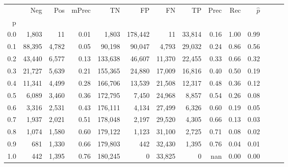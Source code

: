 \begin{tabular}{rrrrrrrrrrrrrr}
\toprule
{} &     Neg &    Pos & mPrec &       TN &       FP &      FN &      TP &  Prec &   Rec & $\hat{p}$ \\
p   &         &        &       &          &          &         &         &       &       &           \\
\midrule
0.0 &   1,803 &     11 &  0.01 &    1,803 &  178,442 &      11 &  33,814 &  0.16 &  1.00 &      0.99 \\
0.1 &  88,395 &  4,782 &  0.05 &   90,198 &   90,047 &   4,793 &  29,032 &  0.24 &  0.86 &      0.56 \\
0.2 &  43,440 &  6,577 &  0.13 &  133,638 &   46,607 &  11,370 &  22,455 &  0.33 &  0.66 &      0.32 \\
0.3 &  21,727 &  5,639 &  0.21 &  155,365 &   24,880 &  17,009 &  16,816 &  0.40 &  0.50 &      0.19 \\
0.4 &  11,341 &  4,499 &  0.28 &  166,706 &   13,539 &  21,508 &  12,317 &  0.48 &  0.36 &      0.12 \\
0.5 &   6,089 &  3,460 &  0.36 &  172,795 &    7,450 &  24,968 &   8,857 &  0.54 &  0.26 &      0.08 \\
0.6 &   3,316 &  2,531 &  0.43 &  176,111 &    4,134 &  27,499 &   6,326 &  0.60 &  0.19 &      0.05 \\
0.7 &   1,937 &  2,021 &  0.51 &  178,048 &    2,197 &  29,520 &   4,305 &  0.66 &  0.13 &      0.03 \\
0.8 &   1,074 &  1,580 &  0.60 &  179,122 &    1,123 &  31,100 &   2,725 &  0.71 &  0.08 &      0.02 \\
0.9 &     681 &  1,330 &  0.66 &  179,803 &      442 &  32,430 &   1,395 &  0.76 &  0.04 &      0.01 \\
1.0 &     442 &  1,395 &  0.76 &  180,245 &        0 &  33,825 &       0 &   nan &  0.00 &      0.00 \\
\bottomrule
\end{tabular}
